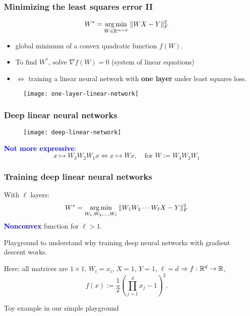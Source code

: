 \documentclass[aspectratio=149]{beamer}
\begin{document}
\begin{frame}
  \frametitle{Minimizing the least squares error II}
  \begin{equation}
    W^* = \operatorname*{arg\,min}_{W\in \mathbb{R}^{m\times d}}\, \Vert W X - Y \Vert_F^2
  \end{equation}
  \begin{minipage}{0.5\textwidth}
  \begin{itemize}
    \item global minimum of a convex quadratic function $f(W)$.
    \item To find $W^*$, solve $\nabla f(W)=0$ (system of linear equations)
    \item $\Leftrightarrow$ training a linear neural network with \textbf{one layer} under least squares loss.
  \end{itemize}
  \end{minipage}
  \begin{minipage}{0.45\textwidth}
    \begin{figure}[ht]
      \centering
      \texttt{[image: one-layer-linear-network]}
    \end{figure}
  \end{minipage}
\end{frame}

\begin{frame}
  \frametitle{Deep linear neural networks}
  \begin{figure}[ht]
    \centering
    \texttt{[image: deep-linear-network]}
  \end{figure}
  \textcolor{blue}{\textbf{Not more expressive}}:
  \begin{equation}
    x \mapsto W_3 W_2 W_1 x \Leftrightarrow x \mapsto Wx, \quad \text{for } W := W_3 W_2 W_1
  \end{equation}
\end{frame}


\begin{frame}
  \frametitle{Training deep linear neural networks}
  With $\ell$ layers:
  \begin{equation}
    W^* = \operatorname*{arg\,min}_{W_1, W_2, \dots,  W_\ell} \Vert W_1 W_2 \cdots W_\ell X - Y \Vert_F^2
  \end{equation}
  \textcolor{blue}{\textbf{Nonconvex}} function for $\ell > 1$.

  Playground to understand why training deep neural networks with gradient descent works.

  Here: all matrices are $1 \times 1$, $W_i = x_i$, $X=1$, $Y = 1$, $\ell = d$
  $\Rightarrow f: \mathbb{R}^d \to \mathbb{R}$,
  \begin{equation}
    f(x) := \frac12 {\left(\prod_{j=1}^d x_j - 1\right)}^2 .
  \end{equation}

  Toy example in our simple playground
\end{frame}
\end{document}

